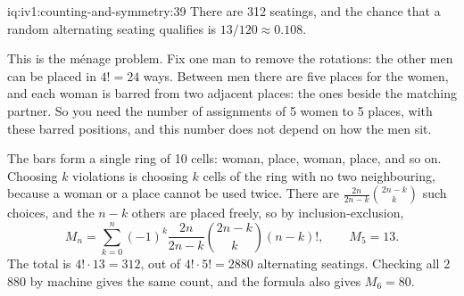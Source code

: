 \begin{solution}{iq:iv1:counting-and-symmetry:39}
There are 312 seatings, and the chance that a random alternating seating qualifies is $13/120 \approx 0.108$.

This is the m\'enage problem. Fix one man to remove the rotations: the other men can be placed in $4! = 24$ ways. Between men there are five places for the women, and each woman is barred from two adjacent places: the ones beside the matching partner. So you need the number of assignments of 5 women to 5 places, with these barred positions, and this number does not depend on how the men sit.

The bars form a single ring of 10 cells: woman, place, woman, place, and so on. Choosing $k$ violations is choosing $k$ cells of the ring with no two neighbouring, because a woman or a place cannot be used twice. There are $\frac{2n}{2n - k}\binom{2n - k}{k}$ such choices, and the $n - k$ others are placed freely, so by inclusion-exclusion,
\[
M_n = \sum_{k=0}^{n} (-1)^k \frac{2n}{2n - k}\binom{2n - k}{k} (n - k)!, \qquad M_5 = 13.
\]
The total is $4! \cdot 13 = 312$, out of $4! \cdot 5! = 2880$ alternating seatings. Checking all 2\,880 by machine gives the same count, and the formula also gives $M_6 = 80$.

\end{solution}

